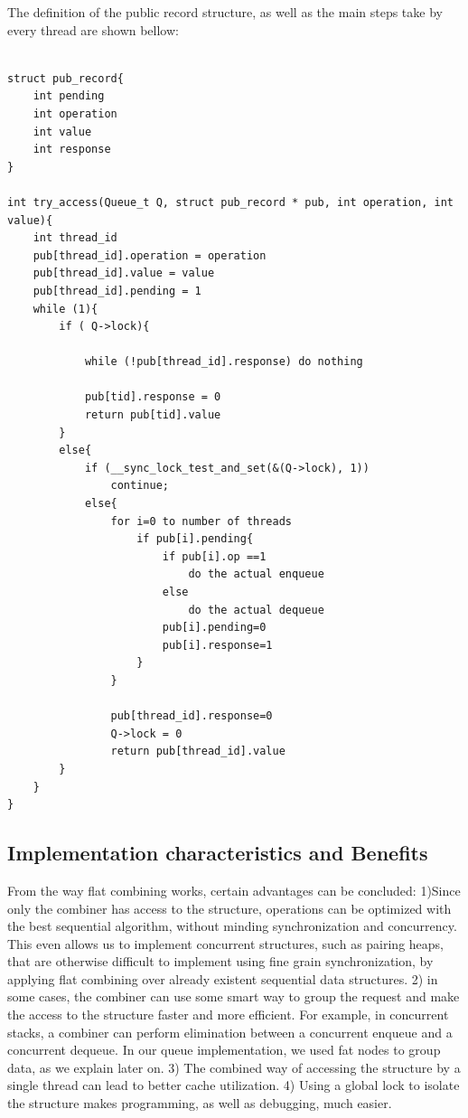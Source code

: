 The definition of the public record structure, as well as the main steps take by every thread are shown bellow:

\begin{lstlisting}

struct pub_record{
	int pending
	int operation
	int value
	int response
} 

int try_access(Queue_t Q, struct pub_record * pub, int operation, int value){
	int thread_id
	pub[thread_id].operation = operation
	pub[thread_id].value = value
	pub[thread_id].pending = 1
	while (1){
		if ( Q->lock){

			while (!pub[thread_id].response) do nothing
			
			pub[tid].response = 0
			return pub[tid].value
		}
		else{
			if (__sync_lock_test_and_set(&(Q->lock), 1)) 
				continue;
			else{
				for i=0 to number of threads
					if pub[i].pending{
						if pub[i].op ==1
							do the actual enqueue
						else
							do the actual dequeue
						pub[i].pending=0
						pub[i].response=1
					}
				}
				
				pub[thread_id].response=0
				Q->lock = 0
				return pub[thread_id].value
		}
	}
}				

\end{lstlisting}

\subsection{Implementation characteristics and Benefits}
From the way flat combining works, certain advantages can be concluded:
1)Since only the combiner has access to the structure, operations can be optimized with the best sequential algorithm, without minding synchronization and concurrency. This even allows us to implement concurrent structures, such as pairing heaps, that are otherwise difficult to implement using fine grain synchronization, by applying flat combining over already existent sequential data structures.
2) in some cases, the combiner can use some smart way to group the request and make the access to the structure faster and more efficient. For example, in concurrent stacks, a combiner can perform elimination between a concurrent enqueue and a concurrent dequeue. In our queue implementation, we used fat nodes to group data, as we explain later on.
3) The combined way of accessing the structure by a single thread can lead to better cache utilization.
4) Using a global lock to isolate the structure makes programming, as well as debugging, much easier.


